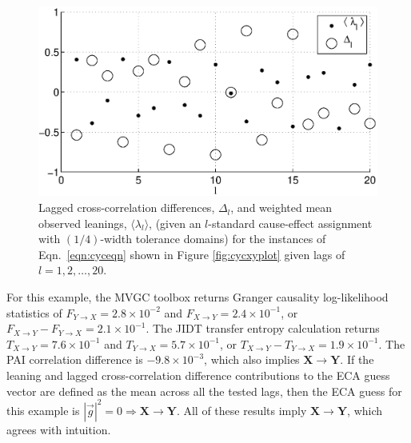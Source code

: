 \begin{figure}[ht]
\begin{center}
\includegraphics[scale=0.7]{NoisyCyclicResponseExample_LandLCC.eps} 
\end{center}
\caption{Lagged cross-correlation differences, $\Delta_l$, and weighted mean observed leanings, $\langle\lambda_l\rangle$, (given an $l$-standard cause-effect assignment with $(1/4)$-width tolerance domains) for the instances of Eqn.\ \ref{eqn:cyceqn} shown in Figure \ref{fig:cycxyplot} given lags of $l=1,2,\ldots,20$.}
\label{fig:cycxyLandLCC}
\end{figure}

For this example, the MVGC toolbox returns Granger causality log-likelihood statistics of $F_{Y\rightarrow X}=2.8\times 10^{-2}$ and $F_{X\rightarrow Y}=2.4\times 10^{-1}$, or $F_{X\rightarrow Y}-F_{Y\rightarrow X}=2.1\times 10^{-1}$.  The JIDT transfer entropy calculation returns $T_{X\rightarrow Y}=7.6\times 10^{-1}$ and $T_{Y\rightarrow X}=5.7\times 10^{-1}$, or $T_{X\rightarrow Y}-T_{Y\rightarrow X}=1.9\times 10^{-1}$.  The PAI correlation difference is $-9.8\times 10^{-3}$, which also implies $\mathbf{X}\rightarrow\mathbf{Y}$.  If the leaning and lagged cross-correlation difference contributions to the ECA guess vector are defined as the mean across all the tested lags, then the ECA guess for this example is $|\vec{g}|^2=0\Rightarrow \mathbf{X}\rightarrow\mathbf{Y}$.  All of these results imply $\mathbf{X}\rightarrow\mathbf{Y}$, which agrees with intuition.    

